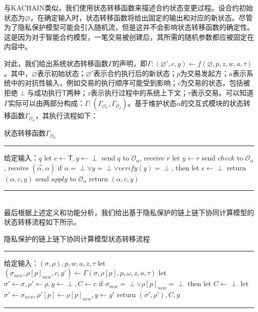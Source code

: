 与KACHAIN\cite{9505181}类似，我们使用状态转移函数来描述合约状态变更过程。设合约初始状态为$\varnothing$，在确定输入时，状态转移函数将给出固定的输出和对应的新状态。尽管为了隐私保护模型可能会引入随机流，但是这并不会影响状态转移函数的确定性。这是因为对于智能合约模型，一笔交易被创建后，其所需的随机参数都应被固定在内容中。

对此，我们给出系统状态转移函数$\Gamma$的声明，即$\Gamma:(\varnothing', c, y) \leftarrow f(\varnothing, p, z, w, a, \tau)$。其中，$\varnothing$表示初始状态；$\varnothing'$表示合约执行后的新状态；$p$为交易发起方；$a$表示系统中的对抗性输入，例如交易的执行顺序可能受到影响；$c$为交易的状态，包括被拒绝$\perp$与成功执行$\mathsf{T}$两种；$z$表示执行过程中的系统上下文；$\tau$表示交易。可以知道$\Gamma$实际可以由两部分构成：$\Gamma: (\Gamma_{\mathcal{O}_\sigma}, \Gamma_{\mathcal{O}_\rho})$。基于维护状态$\alpha$的交互式模块的状态转移函数$\Gamma_{\mathcal{O}_\alpha}$，其执行流程如下：
\begin{center}
    状态转移函数$\Gamma_{\mathcal{O}_\alpha}$
\end{center}
\noindent\hrule
\begin{description}
    \setlength{\itemsep}{0pt}
    \setlength{\parsep}{0pt}
    \setlength{\parskip}{0pt}
    \item 给定输入：$q$
    \subitem let $c \leftarrow \mathsf{T}, y \leftarrow \perp$
    \subitem send $q$ to $\mathcal{O}_\alpha$, receive $r$
    \subitem let $y \leftarrow r$
    \subitem send $check$ to $\mathcal{O}_\alpha$, receive $(\vec{\alpha}, \alpha)$
    \subitem if $\alpha = \perp \vee y = \perp \vee verify(y) = \perp$, then
    \subsubitem let $c \leftarrow \perp$
    \subsubitem return $(\alpha, c, y)$
    \subitem send $apply$ to $\mathcal{O}_\alpha$
    \subitem return $(\alpha,  c, y)$
\end{description}
\noindent\hrule
~\\

最后根据上述定义和功能分析，我们给出基于隐私保护的链上链下协同计算模型的状态转移流程如下所示。
\begin{center}
    隐私保护的链上链下协同计算模型状态转移流程
\end{center}
\noindent\hrule
\begin{description}
    \setlength{\itemsep}{0pt}
    \setlength{\parsep}{0pt}
    \setlength{\parskip}{0pt}
    \item 给定输入：$(\sigma, \rho), p, w, a, z, \tau$
    \subitem let $(\sigma_{new}, \rho[p]_{new}, c, y') \leftarrow \Gamma(\sigma, \rho[p], p, \omega, z, a, \tau)$
    \subitem let $\sigma' \leftarrow \sigma, \rho' \leftarrow \rho, y \leftarrow \perp, C \leftarrow c$
    \subitem if $\sigma_{new} = \perp \vee \rho[p]_{new} = \perp$ then
        \subsubitem let $C \leftarrow \perp$
    \subitem let $\sigma' \leftarrow \sigma_{new}, \rho'[p] \leftarrow \rho[p]_{new}, y \leftarrow y'$
    \subitem return $(\sigma', \rho'), C, y$
\end{description}
\noindent\hrule

